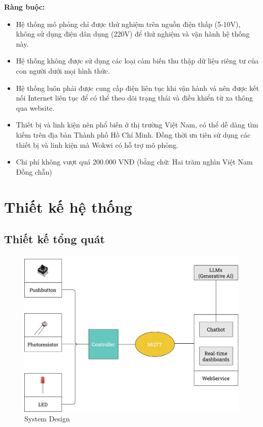 \textbf{Ràng buộc:} 
\begin{itemize}
    \item Hệ thống mô phỏng chỉ được thử nghiệm trên nguồn điện thấp (5-10V), không sử dụng điện dân dụng (220V) để thử nghiệm và vận hành hệ thống này.
    \item Hệ thống không được sử dụng các loại cảm biến thu thập dữ liệu riêng tư của con người dưới mọi hình thức.
    \item Hệ thống luôn phải được cung cấp điện liên tục khi vận hành và nên được kết nối Internet liên tục để có thể theo dõi trạng thái và điều khiển từ xa thông qua website.  
    \item Thiết bị và linh kiện nên phổ biến ở thị trường Việt Nam, có thể dễ dàng tìm kiếm trên địa bàn Thành phố Hồ Chí Minh. Đồng thời ưu tiên sử dụng các thiết bị và linh kiện mà Wokwi có hỗ trợ mô phỏng.
    \item Chi phí không vượt quá 200.000 VNĐ (bằng chữ: Hai trăm nghìn Việt Nam Đồng chẵn)
\end{itemize}

\pagebreak
\section{Thiết kế hệ thống}
\subsection{Thiết kế tổng quát}
\begin{figure}[H]
    \centering
    \includegraphics[width=\textwidth]{img/SystemDesign.jpg}
    \caption{System Design}
    \label{fig:SystemDesign}
\end{figure}

